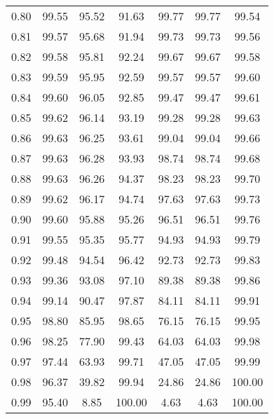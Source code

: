 \begin{tabular}{|c|c|c|c|c|c|c|}
      0.80 &     99.55 &     95.52 &      91.63 &   99.77 &      99.77 &         99.54 \\
      0.81 &     99.57 &     95.68 &      91.94 &   99.73 &      99.73 &         99.56 \\
      0.82 &     99.58 &     95.81 &      92.24 &   99.67 &      99.67 &         99.58 \\
      0.83 &     99.59 &     95.95 &      92.59 &   99.57 &      99.57 &         99.60 \\
      0.84 &     99.60 &     96.05 &      92.85 &   99.47 &      99.47 &         99.61 \\
      0.85 &     99.62 &     96.14 &      93.19 &   99.28 &      99.28 &         99.63 \\
      0.86 &     99.63 &     96.25 &      93.61 &   99.04 &      99.04 &         99.66 \\
      0.87 &     99.63 &     96.28 &      93.93 &   98.74 &      98.74 &         99.68 \\
      0.88 &     99.63 &     96.26 &      94.37 &   98.23 &      98.23 &         99.70 \\
      0.89 &     99.62 &     96.17 &      94.74 &   97.63 &      97.63 &         99.73 \\
      0.90 &     99.60 &     95.88 &      95.26 &   96.51 &      96.51 &         99.76 \\
      0.91 &     99.55 &     95.35 &      95.77 &   94.93 &      94.93 &         99.79 \\
      0.92 &     99.48 &     94.54 &      96.42 &   92.73 &      92.73 &         99.83 \\
      0.93 &     99.36 &     93.08 &      97.10 &   89.38 &      89.38 &         99.86 \\
      0.94 &     99.14 &     90.47 &      97.87 &   84.11 &      84.11 &         99.91 \\
      0.95 &     98.80 &     85.95 &      98.65 &   76.15 &      76.15 &         99.95 \\
      0.96 &     98.25 &     77.90 &      99.43 &   64.03 &      64.03 &         99.98 \\
      0.97 &     97.44 &     63.93 &      99.71 &   47.05 &      47.05 &         99.99 \\
      0.98 &     96.37 &     39.82 &      99.94 &   24.86 &      24.86 &        100.00 \\
      0.99 &     95.40 &      8.85 &     100.00 &    4.63 &       4.63 &        100.00 \\
\bottomrule
\end{tabular}
